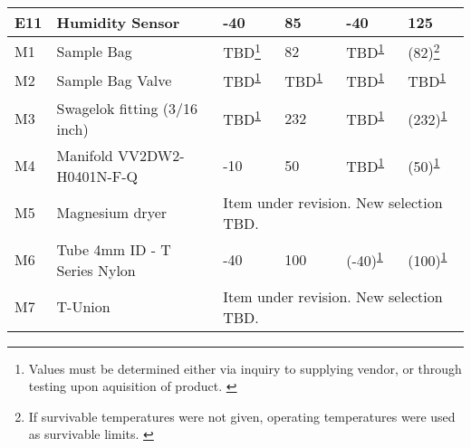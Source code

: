 \begin{longtable}{|m{1cm}|m{3.5cm}|m{1.5cm}|m{1.5cm}|m{1.5cm}|m{1.5cm}|}
E11 & Humidity Sensor & -40 & 85 & -40 & 125 \\ \hline
M1 & Sample Bag & TBD\footnote{Values must be determined either via inquiry to supplying vendor, or through testing upon aquisition of product.
\label{fn:thermran1}} & 82 & TBD\textsuperscript{\ref{fn:thermran1}} & (82)\footnote{If survivable temperatures were not given, operating temperatures were used as survivable limits.
\label{fn:thermran2}} \\ \hline
M2 & Sample Bag Valve & TBD\textsuperscript{\ref{fn:thermran1}} & TBD\textsuperscript{\ref{fn:thermran1}} & TBD\textsuperscript{\ref{fn:thermran1}} & TBD\textsuperscript{\ref{fn:thermran1}} \\ \hline
M3 & Swagelok fitting (3/16 inch) & TBD\textsuperscript{\ref{fn:thermran1}} & 232 & TBD\textsuperscript{\ref{fn:thermran1}} & (232)\textsuperscript{\ref{fn:thermran2}}  \\ \hline
M4 & Manifold VV2DW2-H0401N-F-Q & -10 & 50 & TBD\textsuperscript{\ref{fn:thermran1}} & (50)\textsuperscript{\ref{fn:thermran2}} \\ \hline
M5 & Magnesium dryer & \multicolumn{4}{l|}{Item under revision. New selection TBD.} \\ \hline
M6 & Tube 4mm ID - T Series Nylon & -40 & 100 & (-40)\textsuperscript{\ref{fn:thermran2}} & (100)\textsuperscript{\ref{fn:thermran2}} \\ \hline
M7 & T-Union & \multicolumn{4}{l|}{Item under revision. New selection TBD.} \hline


\caption{Thermal Table}
\label{tab:thermal-table}
\end{longtable}
\raggedbottom








